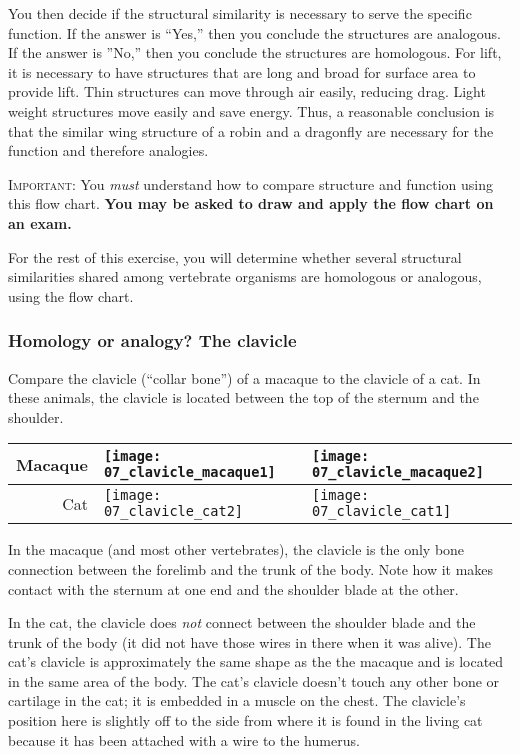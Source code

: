 \documentclass[12pt, hidelinks]{exam}
\begin{document}
\begin{questions}
You then decide if the structural similarity is necessary to serve the specific function. 
If the answer is “Yes,” then you conclude the structures are analogous. If the answer is
”No,” then you conclude the structures are homologous. For lift, it is necessary to have
structures that are long and broad for surface area to provide lift. Thin structures can
move through air easily, reducing drag. Light weight structures move easily and
save energy. Thus, a reasonable conclusion is that the similar wing structure of
a robin and a dragonfly are necessary for the function and therefore analogies.

\textsc{Important:} You \emph{must} understand how to compare structure and function
using this flow chart. \textbf{You may be asked to draw and apply the flow chart on an exam.}

For the rest of this exercise, you will determine whether several structural similarities
shared among vertebrate organisms are homologous or analogous, using the flow chart.

\subsubsection*{Homology or analogy? The clavicle}

\question
Compare the clavicle (``collar bone'') of a macaque to the clavicle of a cat. In these animals, the clavicle is located between the top of the sternum and the shoulder.

\begin{longtable}[c]{@{}rll@{}}
  \toprule
  Macaque &
  \texttt{[image: 07\_clavicle\_macaque1]}	&
  \texttt{[image: 07\_clavicle\_macaque2]}	\tabularnewline
  \midrule
  Cat &
  \texttt{[image: 07\_clavicle\_cat2]}	&
  \texttt{[image: 07\_clavicle\_cat1]}	\tabularnewline
  \bottomrule
\end{longtable}

In the macaque (and most other vertebrates), the clavicle is the only bone connection between
the forelimb and the trunk of the body. Note how it makes contact with
the sternum at one end and the shoulder blade at the other. 

In the cat, the clavicle does \emph{not} connect between the shoulder blade and the trunk of
the body (it did not have those wires in there when it was
alive). %
The cat's clavicle is approximately the same shape as the
the macaque and is located in the same area of the body. %
The cat's clavicle doesn't touch
any other bone or cartilage in the cat; it is embedded in a muscle on the
chest. The clavicle's position here is slightly off to the side from where it is
found in the living cat because it has been attached with a wire to the
humerus.


\end{questions}
\end{document}
